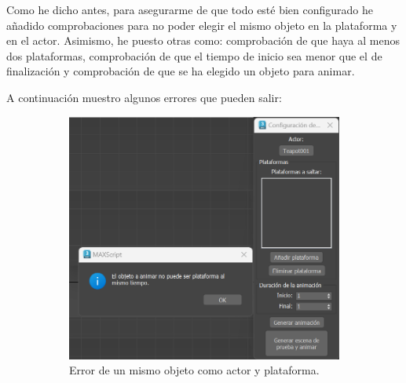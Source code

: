 \bigskip

Como he dicho antes, para asegurarme de que todo esté bien configurado he añadido comprobaciones para no poder elegir el mismo objeto en la plataforma y en el actor. Asimismo, he puesto otras como: comprobación de que haya al menos dos plataformas, comprobación de que el tiempo de inicio sea menor que el de finalización y comprobación de que se ha elegido un objeto para animar.

\bigskip
\newpage

A continuación muestro algunos errores que pueden salir:

\begin{figure}[H]
\begin{subfigure}[t]{0.48\textwidth}
    \centering
    \includegraphics[width=\textwidth]{imagenes/error1.png}
    \caption{Error de un mismo objeto como actor y plataforma.}
 \end{subfigure}
\hfill
 \begin{subfigure}[t]{0.48\textwidth}
    \centering

\end{subfigure}
\end{figure}
